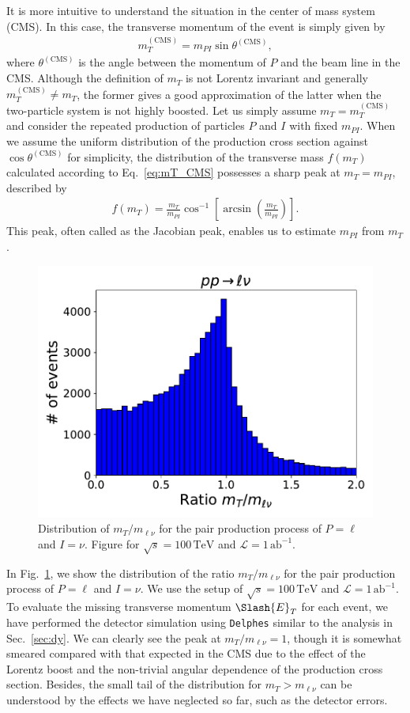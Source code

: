 \documentclass[12pt,twoside,book]{article}
\begin{document}
It is more intuitive to understand the situation in the center of mass system (CMS).
In this case, the transverse momentum of the event is simply given by
\begin{align}
  m_T^{\mathrm{(CMS)}} = m_{PI} \sin \theta^{(\mathrm{CMS})},
  \label{eq:mT_CMS}
\end{align}
where $\theta^{(\mathrm{CMS})}$ is the angle between the momentum of $P$ and the beam line in the CMS.
Although the definition of $m_T$ is not Lorentz invariant and generally $m_T^{\mathrm{(CMS)}} \neq m_T$, the former gives a good approximation of the latter when the two-particle system is not highly boosted.
Let us simply assume $m_T = m_T^{\mathrm{(CMS)}}$ and consider the repeated production of particles $P$ and $I$ with fixed $m_{PI}$.
When we assume the uniform distribution of the production cross section against $\cos \theta^{(\mathrm{CMS})}$ for simplicity, the distribution of the transverse mass $f(m_T)$ calculated according to Eq.~\eqref{eq:mT_CMS} possesses a sharp peak at $m_T = m_{PI}$, described by
\begin{align}
  f(m_T) =\frac{m_T}{m_{PI}}
  \cos^{-1} \left[ \arcsin \left( \frac{m_T}{m_{PI}} \right) \right].
\end{align}
This peak, often called as the Jacobian peak, enables us to estimate $m_{PI}$ from $m_T$.

\begin{figure}[t]
  \centering
  \includegraphics[width=0.5\hsize]{invariant_vs_transverse.pdf}
  \caption{
    Distribution of $m_T / m_{\ell \nu}$ for the pair production process of $P=\ell$ and $I=\nu$.
    Figure for $\sqrt{s}=100\,\mathrm{TeV}$ and $\mathcal{L}=1\,\mathrm{ab}^{-1}$.
  }
  \label{fig:invariant_vs_transverse}
\end{figure}

In Fig.~\ref{fig:invariant_vs_transverse}, we show the distribution of the ratio $m_T / m_{\ell \nu}$ for the pair production process of $P=\ell$ and $I=\nu$.
We use the setup of $\sqrt{s}=100\,\mathrm{TeV}$ and $\mathcal{L}=1\,\mathrm{ab}^{-1}$.
To evaluate the missing transverse momentum $\Slash{E}_T$ for each event, we have performed the detector simulation using \texttt{Delphes} similar to the analysis in Sec.~\ref{sec:dy}.
We can clearly see the peak at $m_T / m_{\ell \nu} = 1$, though it is somewhat smeared compared with that expected in the CMS due to the effect of the Lorentz boost and the non-trivial angular dependence of the production cross section.
Besides, the small tail of the distribution for $m_T > m_{\ell \nu}$ can be understood by the effects we have neglected so far, such as the detector errors.
\end{document}
